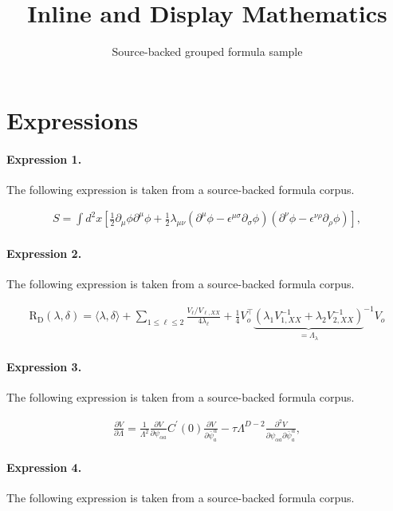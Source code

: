 \documentclass[11pt]{article}
\title{Inline and Display Mathematics}
\author{Source-backed grouped formula sample}
\date{}
\begin{document}
\maketitle
\section{Expressions}
\paragraph{Expression 1.} The following expression is taken from a source-backed formula corpus.

\begin{align*}S=\int d^{2}x\left[{\frac 1 2}{\partial}_{\mu}{\phi}{\partial}^{\mu}{\phi}+{\frac 1 2}{\lambda}_{{\mu}{\nu}}\left({\partial}^{\mu}{\phi}-{\epsilon}^{{\mu}{\sigma}}{\partial}_{\sigma}{\phi}\right)\left({\partial}^{\nu}{\phi}-{\epsilon}^{{\nu}{\rho}}{\partial}_{\rho}{\phi}\right)\right],\end{align*}

\paragraph{Expression 2.} The following expression is taken from a source-backed formula corpus.

\begin{align*}\mathrm{R}_{\mathrm{D}} (\lambda, \delta ) = \langle\lambda, \delta\rangle + \sum_{1\leq \ell \leq 2 } \frac{V_\ell / V_{\ell, X X} }{4 \lambda_\ell} + \frac{1}{4} V_o^{\top} { \underbrace{\left(\lambda_1 V_{1, X X}^{-1}+\lambda_2 V_{2, X X}^{-1}\right) }_{= \Lambda_\lambda} }^{-1} V_o\end{align*}

\paragraph{Expression 3.} The following expression is taken from a source-backed formula corpus.

\begin{align*}\frac{\partial V}{\partial \Lambda}=\frac{1}{\Lambda^{2}}\frac{\partial V}{\partial\psi^{\phantom{a}}_{\alpha a}}C^{\prime}(0)\frac{\partial V}{\partial\bar{\psi}_{a}^{\alpha}}-\tau\Lambda^{D-2}\frac{\partial^{2}V}{\partial\psi^{\phantom{a}}_{\alpha a}\partial\bar{\psi}_{a}^{\alpha}},\end{align*}

\paragraph{Expression 4.} The following expression is taken from a source-backed formula corpus.
\end{document}

